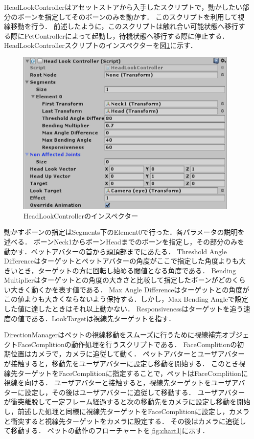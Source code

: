 HeadLookControllerはアセットストアから入手したスクリプトで，動かしたい部分のボーンを指定してそのボーンのみを動かす．
このスクリプトを利用して視線移動を行う．
前述したように，このスクリプトは触れ合い可能状態へ移行する際にPetControllerによって起動し，待機状態へ移行する際に停止する．
HeadLookControllerスクリプトのインスペクターを図\ref{fig:headlook}に示す．

\begin{figure}[H]
\centering
\includegraphics*[width=11cm,clip]{images/sc9.eps}
\caption{HeadLookControllerのインスペクター}
\label{fig:headlook}
\end{figure}

動かすボーンの指定はSegments下のElement0で行った．各パラメータの説明を述べる．
ボーンNeck1からボーンHeadまでのボーンを指定し，その部分のみを動かす．ペットアバターの首から頭頂部までにあたる．
Threshold Angle Differenceはターゲットとペットアバターの角度がここで指定した角度よりも大きいとき，ターゲットの方に回転し始める閾値となる角度である．
Bending Multiplierはターゲットとの角度の大きさと比較して指定したボーンがどのくらい大きく動くかを表す値である．
Max Angle Differenceはターゲットとの角度がこの値よりも大きくならないよう保持する．しかし，Max Bending Angleで設定した値に達したときはそれ以上動かない．
Responsivenessはターゲットを追う速度の値である．LookTargetは視線先ターゲットを指す．

DirectionManagerはペットの視線移動をスムーズに行うために視線補完オブジェクトFaceComplitionの動作処理を行うスクリプトである．
FaceComplitionの初期位置はカメラで，カメラに追従して動く．
ペットアバターとユーザアバターが接触すると，移動先をユーザアバターに設定し移動を開始する．
このとき視線先ターゲットをFaceComplitionに指定することで，ペットはFaceComplitionに視線を向ける．
ユーザアバターと接触すると，視線先ターゲットをユーザアバターに設定し，その後はユーザアバターに追従して移動する．
ユーザアバターが衝突離脱して一定フレーム経過すると次の移動先をカメラに設定し移動を開始し，前述した処理と同様に視線先ターゲットをFaceComplitionに設定し，カメラと衝突すると視線先ターゲットをカメラに設定する．
その後はカメラに追従して移動する．
ペットの動作のフローチャートを\ref{fig:chart1}に示す．

